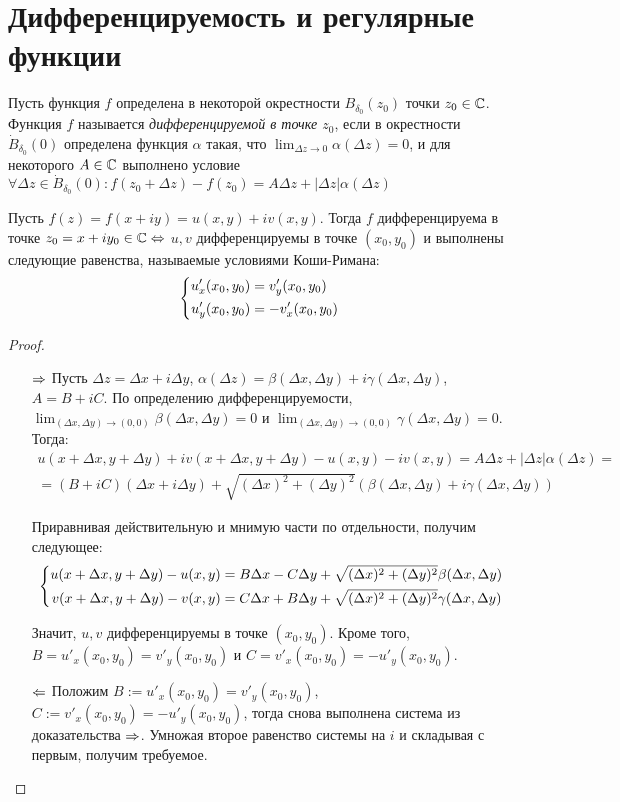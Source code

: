 \section{Дифференцируемость и регулярные функции}

\begin{definition}
	Пусть функция $f$ определена в некоторой окрестности $B_{\delta_0}(z_0)$ точки  $z_0 \in \mathbb{C}$. Функция $f$ называется \textit{дифференцируемой в точке $z_0$}, если в окрестности $\dot B_{\delta_0}{(0)}$ определена функция $\alpha$ такая, что $\lim_{\Delta z \to 0}\alpha(\Delta z) = 0$, и для некоторого $A \in \mathbb{C}$ выполнено условие $\forall \Delta z \in \dot B_{\delta_0}{(0)}: f(z_0 + \Delta z) - f(z_0) = A\Delta z + |\Delta z|\alpha(\Delta z)$
\end{definition}

\begin{theorem}
	Пусть $f(z) = f(x + iy) = u(x, y) + iv(x, y)$. Тогда $f$ дифференцируема в точке $z_0 = x + iy_0 \in \mathbb{C} \Leftrightarrow$ $u, v$ дифференцируемы в точке $(x_0, y_0)$ и выполнены следующие равенства, называемые условиями Коши-Римана:
	\[\left\{\begin{aligned}u'_x(x_0, y_0) &= v'_y(x_0, y_0) \\ u'_y(x_0, y_0) &= -v'_x(x_0, y_0)\end{aligned}\right.\]
\end{theorem}

\begin{proof}~
	\begin{itemize}
		\item[$\Rightarrow$] Пусть $\Delta z = \Delta x + i \Delta y$, $\alpha(\Delta z) = \beta(\Delta x, \Delta y) + i\gamma(\Delta x, \Delta y)$, $A = B + iC$. По определению дифференцируемости, $\lim_{(\Delta x, \Delta y) \to (0, 0)}\beta(\Delta x, \Delta y) = 0$ и $\lim_{(\Delta x, \Delta y) \to (0, 0)}\gamma(\Delta x, \Delta y) = 0$. Тогда:
		\begin{multline*}
			u(x + \Delta x, y + \Delta y) + iv(x + \Delta x, y + \Delta y) - u(x, y) - iv(x, y) =  A\Delta z + |\Delta z|\alpha(\Delta z) =
			\\
			= (B + iC)(\Delta x + i\Delta y) + \sqrt{(\Delta x)^2 + (\Delta y)^2}(\beta(\Delta x, \Delta y) + i\gamma(\Delta x, \Delta y))
		\end{multline*}
		
		Приравнивая действительную и мнимую части по отдельности, получим следующее:
		\[\left\{\begin{aligned}
			u(x + \Delta x, y + \Delta y) - u(x, y) &=  B\Delta x - C\Delta y + \sqrt{(\Delta x)^2 + (\Delta y)^2}\beta(\Delta x, \Delta y)
			\\
			v(x + \Delta x, y + \Delta y) - v(x, y) &= C\Delta x + B\Delta y + \sqrt{(\Delta x)^2 + (\Delta y)^2}\gamma(\Delta x, \Delta y)
		\end{aligned}\right.\]
	
		Значит, $u, v$ дифференцируемы в точке $(x_0, y_0)$. Кроме того, $B = u'_x(x_0, y_0) = v'_y(x_0, y_0)$ и $C = v'_x(x_0, y_0) = -u'_y(x_0, y_0)$.
		
		\item[$\Leftarrow$] Положим $B := u'_x(x_0, y_0) = v'_y(x_0, y_0)$, $C := v'_x(x_0, y_0) = -u'_y(x_0, y_0)$, тогда снова выполнена система из доказательства $\Rightarrow$. Умножая второе равенство системы на $i$ и складывая с первым, получим требуемое.\qedhere
	\end{itemize}
\end{proof}

